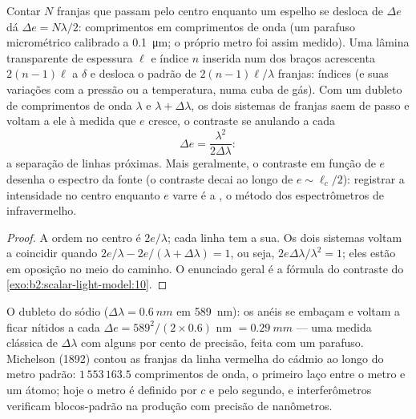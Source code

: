 \begin{proposition}\label{prop:b2:michelson:measure}
Contar $N$ franjas que passam pelo centro enquanto um espelho se desloca de $\Delta e$
dá $\Delta e = N\lambda/2$: comprimentos em comprimentos de onda (um parafuso micrométrico
calibrado a \qty{0.1}{\micro m}; o próprio metro foi assim medido). Uma
lâmina transparente de espessura $\ell$ e índice $n$ inserida num dos braços
acrescenta $2(n - 1)\ell$ a $\delta$ e desloca o padrão de $2(n - 1)\ell/\lambda$
franjas: índices (e suas variações com a pressão ou a temperatura,
numa cuba de gás). Com um dubleto de comprimentos de onda $\lambda$ e $\lambda + \Delta\lambda$, os
dois sistemas de franjas saem de passo e voltam a ele à medida que $e$ cresce, o
contraste se anulando a cada
\[
\Delta e = \frac{\lambda^2}{2\Delta\lambda} :
\]
a separação de linhas próximas. Mais geralmente, o contraste em
função de $e$ desenha o espectro da fonte (o contraste
decai ao longo de $e \sim \ell_c/2$): registrar a intensidade no centro enquanto
$e$ varre é a \emph{}, o método dos
espectrômetros de infravermelho.
\end{proposition}

\begin{proof}
A ordem no centro é $2e/\lambda$; cada linha tem a sua. Os dois
sistemas voltam a coincidir quando $2e/\lambda - 2e/(\lambda + \Delta\lambda) = 1$, ou seja, $2e\Delta\lambda
/\lambda^2 = 1$; eles estão em oposição no meio do caminho. O enunciado geral é
a fórmula do contraste do \cref{exo:b2:scalar-light-model:10}.
\end{proof}

\begin{example}\label{ex:b2:michelson:sodium}
O dubleto do sódio ($\Delta\lambda = \qty{0.6}{nm}$ em \qty{589}{nm}): os anéis se embaçam e
voltam a ficar nítidos a cada $\Delta e = 589^2/(2 \times 0.6)$ nm $= \qty{0.29}{mm}$ --- uma medida
clássica de $\Delta\lambda$ com alguns por cento de precisão, feita com um parafuso. Michelson (1892)
contou as franjas da linha vermelha do cádmio ao longo do
metro padrão: $1\,553\,163.5$ comprimentos de onda, o primeiro laço entre o
metro e um átomo; hoje o metro é definido por $c$ e pelo
segundo, e interferômetros verificam blocos-padrão na produção com
precisão de nanômetros.
\end{example}

